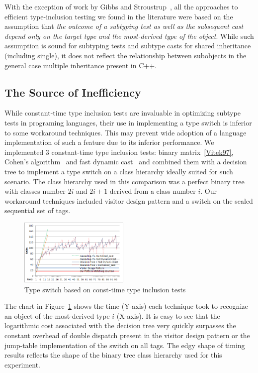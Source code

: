 With the exception of work by Gibbs and Stroustrup~\cite{FastDynCast}, all the 
approaches to efficient type-inclusion testing we found in the literature were 
based on the assumption that \emph{the outcome of a subtyping test as well as 
the subsequent cast depend only on the target type and the most-derived type of 
the object}. While such assumption is sound for subtyping tests and subtype 
casts for shared inheritance (including single), it does not reflect the 
relationship between subobjects in the general case multiple inheritance present 
in C++.

\subsection{The Source of Inefficiency}

While constant-time type inclusion tests are invaluable in optimizing subtype 
tests in programing languages, their use in implementing a type switch is 
inferior to some workaround techniques. This may prevent wide adoption of a 
language implementation of such a feature due to its inferior performance. 
We implemented 3 constant-time type inclusion tests: binary 
matrix~\ref{Vitek97}, Cohen's algorithm~\cite{Cohen91} and fast dynamic 
cast~\cite{FastDynCast} and combined them with a decision tree to implement a 
type switch on a class hierarchy ideally suited for such scenario.  
The class hierarchy used in this comparison was a perfect binary tree with 
classes number $2i$ and $2i+1$ derived from a class number $i$. Our workaround 
techniques included visitor design pattern and a switch on the sealed sequential 
set of tags.

\begin{figure}[htbp]
  \centering
    \includegraphics[width=0.47\textwidth]{DCast-vs-Visitors2.png}
  \caption{Type switch based on const-time type inclusion tests}
  \label{fig:DCastVis2}
\end{figure}

The chart in Figure~\ref{fig:DCastVis2} shows the time (Y-axis) each technique 
took to recognize an object of the most-derived type $i$ (X-axis). It is easy to 
see that the logarithmic cost associated with the decision tree very quickly 
surpasses the constant overhead of double dispatch present in the visitor design
pattern or the jump-table implementation of the switch on all tags. The edgy 
shape of timing results reflects the shape of the binary tree class hierarchy 
used for this experiment.
